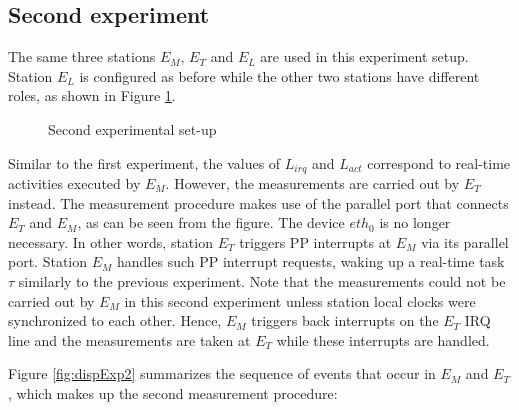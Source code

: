 \documentclass{acm_proc_article-sp}
\begin{document}
\subsection{Second experiment}
\label{sec:exp2}

The same three stations $E_M$, $E_T$ and $E_L$ are used in this experiment
setup. Station $E_L$ is configured as before while the other 
two stations have different roles, as shown in Figure \ref{fig:config2}.

\begin{figure}[htb]
  \centering {\scalebox{1}{}}
  \caption{Second experimental set-up}
  \label{fig:config2}
\end{figure}

\begin{figure*}[t!]
  \centering {\scalebox{1}{}}
  \caption{Interrupt and activation latencies measurement at station $E_M$ for the
    second experiment}
  \label{fig:dispExp2}
\end{figure*}


Similar to the first experiment, the values of $L_{irq}$ and $L_{act}$ correspond to
real-time activities executed by $E_M$. However, the measurements are carried out by
$E_T$ instead. The measurement procedure makes use of the parallel port that
connects $E_T$ and $E_M$, as can be seen from the figure.  The device $eth_0$ is no
longer necessary.  In other words, station $E_T$ triggers PP interrupts at $E_M$ via
its parallel port. Station $E_M$ handles such PP interrupt requests, waking up a
real-time task $\tau$ similarly to the previous experiment. Note that the
measurements could not be carried out by $E_M$ in this second experiment unless
station local clocks were synchronized to each other.  Hence, $E_M$ triggers back
interrupts on the $E_T$ IRQ line and the measurements are taken at $E_T$ while these
interrupts are handled.

Figure \ref{fig:dispExp2} summarizes the sequence of events that occur in $E_M$ and
$E_T$, which makes up the second measurement procedure:
\end{document}
